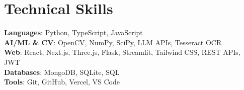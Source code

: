 \documentclass[letterpaper,11pt]{article}
\begin{document}
\section{Technical Skills}
 \begin{itemize}[leftmargin=0.15in, label={}]
    \small{\item{
     \textbf{Languages}{: Python, TypeScript, JavaScript} \\
     \textbf{AI/ML \& CV}{: OpenCV, NumPy, SciPy, LLM APIs, Tesseract OCR} \\
     \textbf{Web}{: React, Next.js, Three.js, Flask, Streamlit, Tailwind CSS, REST APIs, JWT} \\
     \textbf{Databases}{: MongoDB, SQLite, SQL} \\
     \textbf{Tools}{: Git, GitHub, Vercel, VS Code}
    }}
 \end{itemize}
\end{document}
